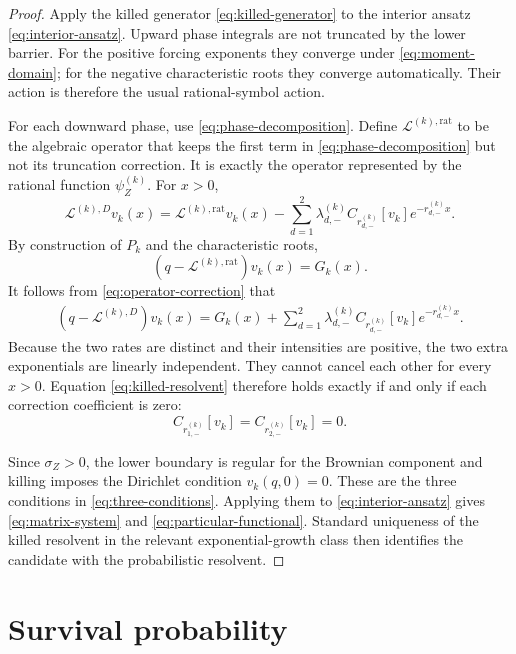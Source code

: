\documentclass[11pt]{article}
\newcommand{\cL}{\mathcal{L}}
\theoremstyle{plain}
\theoremstyle{remark}
\begin{document}
\begin{proof}
Apply the killed generator \eqref{eq:killed-generator} to the interior ansatz
\eqref{eq:interior-ansatz}.  Upward phase integrals are not truncated by the
lower barrier.  For the positive forcing exponents they converge under
\eqref{eq:moment-domain}; for the negative characteristic roots they converge
automatically.  Their action is therefore the usual rational-symbol action.

For each downward phase, use \eqref{eq:phase-decomposition}.  Define
$\cL^{(k),\mathrm{rat}}$ to be the algebraic operator that keeps the first
term in \eqref{eq:phase-decomposition} but not its truncation correction.  It
is exactly the operator represented by the rational function
$\psi_Z^{(k)}$.  For $x>0$,
\begin{equation}\label{eq:operator-correction}
\cL^{(k),D}v_k(x)
=\cL^{(k),\mathrm{rat}}v_k(x)
-\sum_{d=1}^2\lambda_{d,-}^{(k)}
  C_{r_{d,-}^{(k)}}[v_k]e^{-r_{d,-}^{(k)}x}.
\end{equation}
By construction of $P_k$ and the characteristic roots,
\[
(q-\cL^{(k),\mathrm{rat}})v_k(x)=G_k(x).
\]
It follows from \eqref{eq:operator-correction} that
\begin{align}
(q-\cL^{(k),D})v_k(x)
=G_k(x)
 +\sum_{d=1}^2\lambda_{d,-}^{(k)}
  C_{r_{d,-}^{(k)}}[v_k]e^{-r_{d,-}^{(k)}x}.
                                                        \label{eq:residual}
\end{align}
Because the two rates are distinct and their intensities are positive, the
two extra exponentials are linearly independent.  They cannot cancel each
other for every $x>0$.  Equation \eqref{eq:killed-resolvent} therefore holds
exactly if and only if each correction coefficient is zero:
\[
C_{r_{1,-}^{(k)}}[v_k]=C_{r_{2,-}^{(k)}}[v_k]=0.
\]

Since $\sigma_Z>0$, the lower boundary is regular for the Brownian component
and killing imposes the Dirichlet condition $v_k(q,0)=0$.  These are the three
conditions in \eqref{eq:three-conditions}.  Applying them to
\eqref{eq:interior-ansatz} gives \eqref{eq:matrix-system} and
\eqref{eq:particular-functional}.  Standard uniqueness of the killed
resolvent in the relevant exponential-growth class then identifies the
candidate with the probabilistic resolvent.
\end{proof}

\section{Survival probability}
\end{document}
